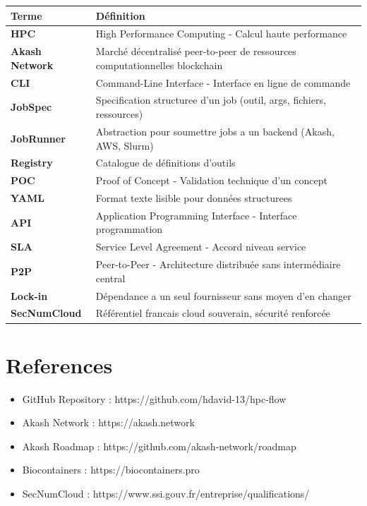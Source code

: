 \documentclass[11pt,a4paper]{article}
\begin{document}
	\begin{tabularx}{\linewidth}{l X}
		\toprule
		\textbf{Terme} & \textbf{Définition} \\
		\midrule
		\textbf{HPC} & High Performance Computing - Calcul haute performance \\
		\textbf{Akash Network} & Marché décentralisé peer-to-peer de ressources computationnelles blockchain \\
		\textbf{CLI} & Command-Line Interface - Interface en ligne de commande \\
		\textbf{JobSpec} & Specification structuree d'un job (outil, args, fichiers, ressources) \\
		\textbf{JobRunner} & Abstraction pour soumettre jobs a un backend (Akash, AWS, Slurm) \\
		\textbf{Registry} & Catalogue de définitions d'outils \\
		\textbf{POC} & Proof of Concept - Validation technique d'un concept \\
		\textbf{YAML} & Format texte lisible pour données structurees \\
		\textbf{API} & Application Programming Interface - Interface programmation \\
		\textbf{SLA} & Service Level Agreement - Accord niveau service \\
		\textbf{P2P} & Peer-to-Peer - Architecture distribuée sans intermédiaire central \\
		\textbf{Lock-in} & Dépendance a un seul fournisseur sans moyen d'en changer \\
		\textbf{SecNumCloud} & Référentiel francais cloud souverain, sécurité renforcée \\
		\bottomrule
	\end{tabularx}
	
	\section{References}
	
	\begin{itemize}
		\item GitHub Repository : https://github.com/hdavid-13/hpc-flow
		\item Akash Network : https://akash.network
		\item Akash Roadmap : https://github.com/akash-network/roadmap
		\item Biocontainers : https://biocontainers.pro
		\item SecNumCloud : https://www.ssi.gouv.fr/entreprise/qualifications/
	\end{itemize}
	
	
\end{document}
